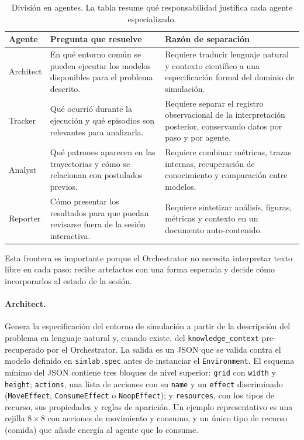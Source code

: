 \begin{table}[H]
\begin{center}
\footnotesize
\setlength{\tabcolsep}{4pt}
\renewcommand{\arraystretch}{1.04}
\begin{tabular}{|>{\raggedright\arraybackslash}p{2.4cm}|>{\raggedright\arraybackslash}p{4.5cm}|>{\raggedright\arraybackslash}p{5.3cm}|} \hline
\textbf{Agente} & \textbf{Pregunta que resuelve} & \textbf{Razón de separación} \\ \hline
Architect & En qué entorno común se pueden ejecutar los modelos disponibles para el problema descrito. & Requiere traducir lenguaje natural y contexto científico a una especificación formal del dominio de simulación. \\ \hline
Tracker & Qué ocurrió durante la ejecución y qué episodios son relevantes para analizarla. & Requiere separar el registro observacional de la interpretación posterior, conservando datos por paso y por agente. \\ \hline
Analyst & Qué patrones aparecen en las trayectorias y cómo se relacionan con postulados previos. & Requiere combinar métricas, trazas internas, recuperación de conocimiento y comparación entre modelos. \\ \hline
Reporter & Cómo presentar los resultados para que puedan revisarse fuera de la sesión interactiva. & Requiere sintetizar análisis, figuras, métricas y contexto en un documento auto-contenido. \\ \hline
\end{tabular}
\caption[División en agentes]{División en agentes. La tabla resume qué
responsabilidad justifica cada agente especializado.}
\label{tab:razon-agentes}
\end{center}
\end{table}

Esta frontera es importante porque el Orchestrator no necesita interpretar
texto libre en cada paso: recibe artefactos con una forma esperada y decide
cómo incorporarlos al estado de la sesión.

\paragraph{Architect.} Genera la especificación del entorno de simulación
a partir de la descripción del problema en lenguaje natural y, cuando
existe, del \texttt{knowledge\_\allowbreak context} pre-recuperado por el
Orchestrator. La salida es un JSON que se valida contra el modelo
definido en \texttt{simlab.spec} antes de instanciar el
\texttt{Environment}. El esquema mínimo del JSON contiene tres bloques
de nivel superior: \texttt{grid} con \texttt{width} y \texttt{height};
\texttt{actions}, una lista de acciones con su \texttt{name} y un
\texttt{effect} discriminado (\texttt{MoveEffect}, \texttt{ConsumeEffect}
o \texttt{NoopEffect}); y \texttt{resources}, con los tipos de
recurso, sus propiedades y reglas de aparición. Un ejemplo
representativo es una rejilla \(8 \times 8\) con acciones de movimiento
y consumo, y un único tipo de recurso (comida) que añade energía al
agente que lo consume.

